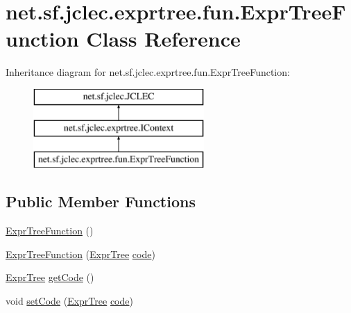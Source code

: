 \hypertarget{classnet_1_1sf_1_1jclec_1_1exprtree_1_1fun_1_1_expr_tree_function}{\section{net.\-sf.\-jclec.\-exprtree.\-fun.\-Expr\-Tree\-Function Class Reference}
\label{classnet_1_1sf_1_1jclec_1_1exprtree_1_1fun_1_1_expr_tree_function}
}
Inheritance diagram for net.\-sf.\-jclec.\-exprtree.\-fun.\-Expr\-Tree\-Function\-:\begin{figure}[H]
\begin{center}
\leavevmode
\includegraphics[height=3.000000cm]{classnet_1_1sf_1_1jclec_1_1exprtree_1_1fun_1_1_expr_tree_function}
\end{center}
\end{figure}
\subsection*{Public Member Functions}
\begin{DoxyCompactItemize}
\item 
\hyperlink{classnet_1_1sf_1_1jclec_1_1exprtree_1_1fun_1_1_expr_tree_function_a5466bce31de5c7bfeba0135881074368}{Expr\-Tree\-Function} ()
\item 
\hyperlink{classnet_1_1sf_1_1jclec_1_1exprtree_1_1fun_1_1_expr_tree_function_a15f7749f19ecb2eb46a83f6e286b1194}{Expr\-Tree\-Function} (\hyperlink{classnet_1_1sf_1_1jclec_1_1exprtree_1_1_expr_tree}{Expr\-Tree} \hyperlink{classnet_1_1sf_1_1jclec_1_1exprtree_1_1fun_1_1_expr_tree_function_a148bc528b69b2c629888767cc5e9adbc}{code})
\item 
\hyperlink{classnet_1_1sf_1_1jclec_1_1exprtree_1_1_expr_tree}{Expr\-Tree} \hyperlink{classnet_1_1sf_1_1jclec_1_1exprtree_1_1fun_1_1_expr_tree_function_ab3e0d6e96614c14b5d57a904c1297f50}{get\-Code} ()
\item 
void \hyperlink{classnet_1_1sf_1_1jclec_1_1exprtree_1_1fun_1_1_expr_tree_function_ae5efd1c619720855ca51de3b5d710ca2}{set\-Code} (\hyperlink{classnet_1_1sf_1_1jclec_1_1exprtree_1_1_expr_tree}{Expr\-Tree} \hyperlink{classnet_1_1sf_1_1jclec_1_1exprtree_1_1fun_1_1_expr_tree_function_a148bc528b69b2c629888767cc5e9adbc}{code})
\end{DoxyCompactItemize}
